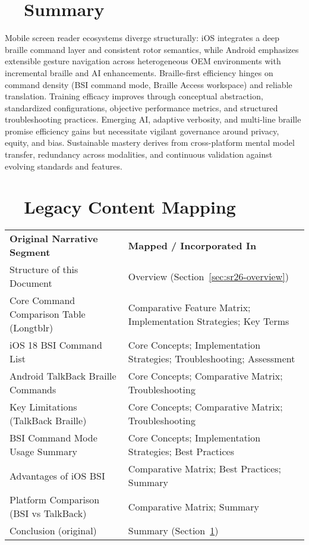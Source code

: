 \section{~~Summary}
\label{sec:sr26-summary}
Mobile screen reader ecosystems diverge structurally: iOS integrates a deep braille command layer and consistent rotor semantics, while Android emphasizes extensible gesture navigation across heterogeneous OEM environments with incremental braille and AI enhancements. Braille-first efficiency hinges on command density (BSI command mode, Braille Access workspace) and reliable translation. Training efficacy improves through conceptual abstraction, standardized configurations, objective performance metrics, and structured troubleshooting practices. Emerging AI, adaptive verbosity, and multi-line braille promise efficiency gains but necessitate vigilant governance around privacy, equity, and bias. Sustainable mastery derives from cross-platform mental model transfer, redundancy across modalities, and continuous validation against evolving standards and features.

\section{~~Legacy Content Mapping}
\label{sec:sr26-legacy-mapping}
\begin{tabular}{p{} p{}}
	\textbf{Original Narrative Segment}      & \textbf{Mapped / Incorporated In}                                     \\
	Structure of this Document               & Overview (Section~\ref{sec:sr26-overview})                            \\
	Core Command Comparison Table (Longtblr) & Comparative Feature Matrix; Implementation Strategies; Key Terms      \\
	iOS 18 BSI Command List                  & Core Concepts; Implementation Strategies; Troubleshooting; Assessment \\
	Android TalkBack Braille Commands        & Core Concepts; Comparative Matrix; Troubleshooting                    \\
	Key Limitations (TalkBack Braille)       & Core Concepts; Comparative Matrix; Troubleshooting                    \\
	BSI Command Mode Usage Summary           & Core Concepts; Implementation Strategies; Best Practices              \\
	Advantages of iOS BSI                    & Comparative Matrix; Best Practices; Summary                           \\
	Platform Comparison (BSI vs TalkBack)    & Comparative Matrix; Summary                                           \\
	Conclusion (original)                    & Summary (Section~\ref{sec:sr26-summary})                              \\
\end{tabular}

